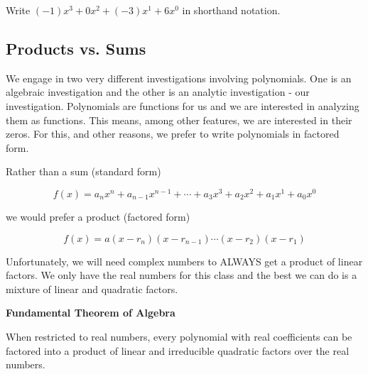 \documentclass{ximera}
\begin{document}
\begin{question}

Write $(-1) x^3 + 0 x^2 + (-3) x^1 + 6 x^0$ in shorthand notation.


\begin{multipleChoice}
\end{multipleChoice}

\end{question}










\subsection*{Products vs. Sums}


We engage in two very different investigations involving polynomials.  One is an algebraic investigation and the other is an analytic investigation - our investigation.  Polynomials are functions for us and we are interested in analyzing them as functions.  This means, among other features, we are interested in their zeros.  For this, and other reasons, we prefer to write polynomials in factored form.



Rather than a sum (standard form)

\[   f(x) = a_n x^n + a_{n-1} x^{n-1} + \cdots + a_3 x^3 + a_2 x^2 + a_1 x^1 + a_0 x^0      \]

we would prefer a product (factored form)

\[   f(x) = a (x-r_n)(x-r_{n-1})  \cdots (x-r_2)(x-r_1)  \]





Unfortunately, we will need complex numbers to ALWAYS get a product of linear factors.  We only have the real numbers for this class and the best we can do is a mixture of linear and quadratic factors.



\begin{theorem} \textbf{\textcolor{green!50!black}{Fundamental Theorem of Algebra}}

When restricted to real numbers, every polynomial with real coefficients can be factored into a product of linear and irreducible quadratic factors over the real numbers.

\end{theorem}
\end{document}
